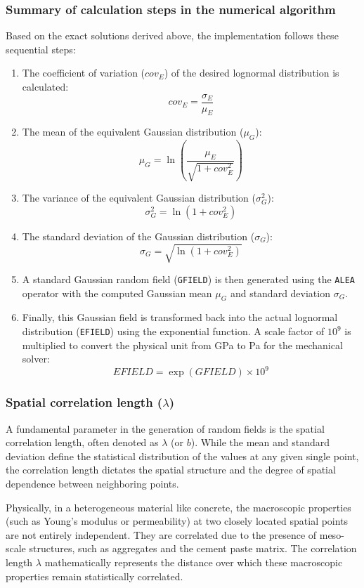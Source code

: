 \documentclass[a4paper,12pt,twoside]{report}     %
\begin{document}
\subsubsection{Summary of calculation steps in the numerical algorithm}
Based on the exact solutions derived above, the implementation follows these sequential steps:
\begin{enumerate}
    \item The coefficient of variation ($cov_E$) of the desired lognormal distribution is calculated:
    \[
    cov_E = \frac{\sigma_E}{\mu_E}
    \]
    \item The mean of the equivalent Gaussian distribution ($\mu_G$):
    \[
    \mu_G = \ln\left(\frac{\mu_E}{\sqrt{1 + cov_E^2}}\right)
    \]
    \item The variance of the equivalent Gaussian distribution ($\sigma_G^2$):
    \[
    \sigma_G^2 = \ln(1 + cov_E^2)
    \]
    \item The standard deviation of the Gaussian distribution ($\sigma_G$):
    \[
    \sigma_G = \sqrt{\ln(1 + cov_E^2)}
    \]
    \item A standard Gaussian random field (\texttt{GFIELD}) is then generated using the \texttt{ALEA} operator with the computed Gaussian mean $\mu_G$ and standard deviation $\sigma_G$.
    \item Finally, this Gaussian field is transformed back into the actual lognormal distribution (\texttt{EFIELD}) using the exponential function. A scale factor of $10^9$ is multiplied to convert the physical unit from GPa to Pa for the mechanical solver:
    \[
    EFIELD = \exp(GFIELD) \times 10^9
    \]
\end{enumerate}

\subsubsection{Spatial correlation length ($\lambda$)}

A fundamental parameter in the generation of random fields is the spatial correlation length, often denoted as $\lambda$ (or $b$). While the mean and standard deviation define the statistical distribution of the values at any given single point, the correlation length dictates the spatial structure and the degree of spatial dependence between neighboring points.

Physically, in a heterogeneous material like concrete, the macroscopic properties (such as Young's modulus or permeability) at two closely located spatial points are not entirely independent. They are correlated due to the presence of meso-scale structures, such as aggregates and the cement paste matrix. The correlation length $\lambda$ mathematically represents the distance over which these macroscopic properties remain statistically correlated. 
\end{document}
